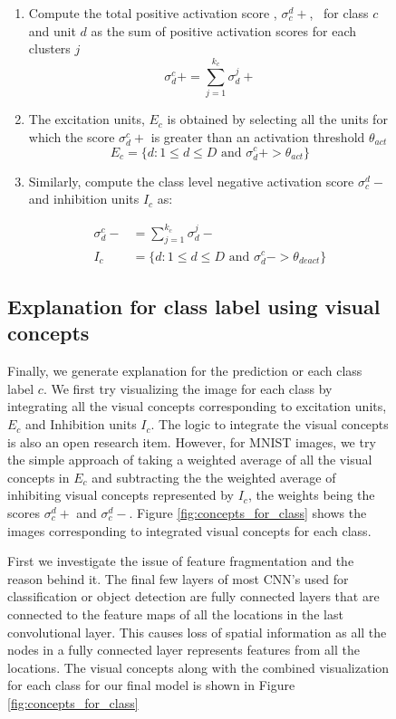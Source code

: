 \documentclass[pdflatex,referee,lineno]{sn-jnl}
\theoremstyle{thmstyleone}
\theoremstyle{thmstyletwo}
\theoremstyle{thmstylethree}
\begin{document}
\begin{figure}[t]
\begin{enumerate}
\item Compute the total positive activation score , $\sigma_c^d+$,  for class $c$  and   unit $d$ as the sum of positive activation scores for each clusters $j$
\begin{equation}
    \sigma_d^c+= \sum_{j=1}^{k_c}\sigma_d^j+
\end{equation}
\item The excitation units, $E_c$ is obtained by  selecting all the units for which the score $\sigma_d^c+$  is greater than an activation threshold  $ \theta_{act}$
\begin{equation}
    E_c = \{d:1\le d\le D \text{ and }  \sigma_d^c+>\theta_{act}\}
\end{equation}
\item Similarly, compute the class level  negative activation score $\sigma_c^d-$ and inhibition units $I_c$ as:
\begin{fleqn}
\begin{align}
    \sigma_d^c-&= \sum_{j=1}^{k_c}\sigma_d^j-\\
    I_c &= \{d:1\le d\le D \text{ and }  \sigma_d^c->\theta_{deact}\}
\end{align}
\end{fleqn}
\end{enumerate}

\subsection{ Explanation for class label using visual concepts}
Finally, we generate explanation for the prediction or each class label $c$. We first try visualizing the image for each class by integrating all the visual concepts corresponding to excitation units, $E_c$ and Inhibition units $I_c$.  The logic to integrate the visual concepts is also an open research item. However, for MNIST images, we try the simple approach of taking a weighted average of all the visual concepts in $E_c$ and subtracting the the weighted average of inhibiting visual concepts represented by $I_c$, the weights being the scores $\sigma_c^d+$  and $\sigma_c^d-$. Figure \ref{fig:concepts_for_class} shows the images corresponding to  integrated visual concepts for each class.
 
First we investigate the issue of feature fragmentation and the reason behind it.  The final few layers of most  CNN's used for classification or object detection are fully connected layers that are connected to the feature maps of all the locations in the last convolutional layer. This causes loss of spatial information as all the nodes in a fully connected layer represents features from all the locations. The visual concepts along with the combined visualization for each class for our final model is shown in Figure \ref{fig:concepts_for_class}


\end{figure}
\end{document}
